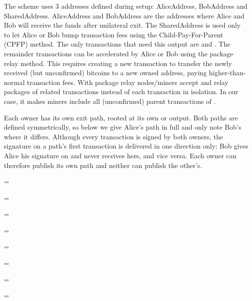 The scheme uses 3 addresses defined during setup: AliceAddress, BobAddress and SharedAddress. AliceAddress and BobAddress are the addresses where Alice and Bob will receive the funds after unilateral exit. The SharedAddress is used only to let Alice or Bob bump transaction fees using the Child-Pay-For-Parent (CPFP) method. The only transactions that need this output are  and . The remainder transactions can be accelerated by Alice or Bob using the package relay method. This requires creating a new transaction  to transfer the newly received (but unconfirmed) bitcoins to a new owned address, paying higher-than-normal transaction fees. With package relay nodes/miners accept and relay packages of related transactions instead of each transaction in isolation. In our case, it makes miners include all (unconfirmed) parent transactions of .

Each owner has its own exit path, rooted at its own  or  output. Both paths are defined symmetrically, so below we give Alice's path in full and only note Bob's where it differs. Although every transaction is signed by both owners, the signature on a path's first transaction is delivered in one direction only: Bob gives Alice his signature on  and never receives hers, and vice versa. Each owner can therefore publish its own path and neither can publish the other's.

 = 

 =\tuple{-, -}

   =\tuple{-, -} 

 = 

 =  

 =  

 =  

 =  

